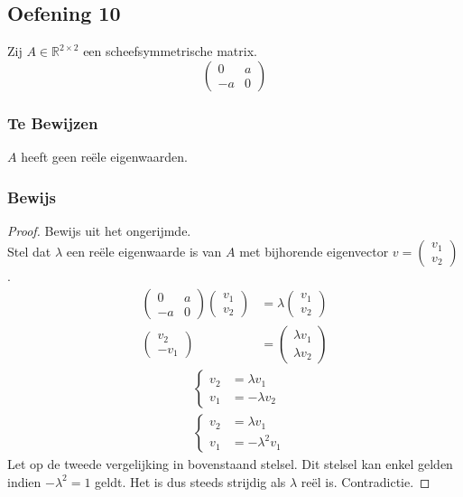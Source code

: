 \documentclass[lineaire_algebra_oplossingen.tex]{subfiles}
\begin{document}
\subsection{Oefening 10}
Zij $A \in \mathbb{R}^{2\times 2}$ een scheefsymmetrische matrix.
\[
\begin{pmatrix}
0 & a\\
-a & 0
\end{pmatrix}
\]

\subsubsection*{Te Bewijzen}
$A$ heeft geen re\"ele eigenwaarden.

\subsubsection*{Bewijs}
\begin{proof}
Bewijs uit het ongerijmde.\\
Stel dat $\lambda$ een re\"ele eigenwaarde is van $A$ met bijhorende eigenvector $v = \begin{pmatrix}v_1\\v_2\end{pmatrix}$.
\begin{align*}
\begin{pmatrix}
0 & a\\
-a & 0
\end{pmatrix}
\begin{pmatrix}v_1\\v_2\end{pmatrix}
&=\lambda 
\begin{pmatrix}v_1\\v_2\end{pmatrix}\\
\begin{pmatrix}
v_2\\-v_1
\end{pmatrix}
&=
\begin{pmatrix}
\lambda v_1\\\lambda v_2
\end{pmatrix}
\end{align*}
\begin{align*}
&\left\{
\begin{array}{ll}
v_2 &= \lambda v_1\\
v_1 &= -\lambda v_2
\end{array}
\right. \\
&\left\{
\begin{array}{ll}
v_2 &= \lambda v_1\\
v_1 &= -\lambda^2 v_1
\end{array}
\right.
\end{align*}
Let op de tweede vergelijking in bovenstaand stelsel. Dit stelsel kan enkel gelden indien $-\lambda^2 = 1$ geldt. Het is dus steeds strijdig als $\lambda$ re\"el is. Contradictie.
\end{proof}
\end{document}
